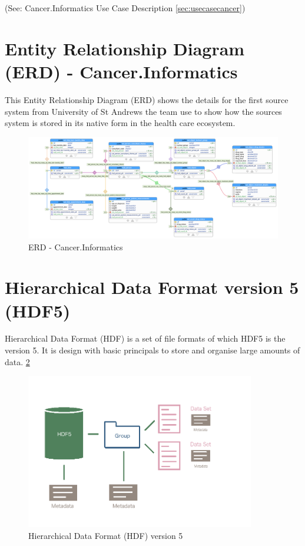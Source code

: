 (See: Cancer.Informatics Use Case Description \ref{sec:usecasecancer})

\section{Entity Relationship Diagram (ERD) - Cancer.Informatics}

This Entity Relationship Diagram (ERD) shows the details for the first source system from University of St Andrews the team use to show how the sources system is stored in its native form in the health care ecosystem.

\begin{figure}[H]
    \centering
    \includegraphics[width=14cm]{figures/technical/dv_chemocare_treatment_db.png}
    \caption{ERD - Cancer.Informatics}
    \label{fig:figERD_CancerInformatics}
\end{figure}

\section{Hierarchical Data Format version 5 (HDF5)}

Hierarchical Data Format (HDF) is a set of file formats of which HDF5 is the version 5. It is design with basic principals to store and organise large amounts of data. \ref{fig:figHDF5} \cite{Folk2011}

\begin{figure}[H]
    \centering
    \includegraphics[width=10cm]{figures/technical/HDF5.png}
    \caption{Hierarchical Data Format (HDF) version 5}
    \label{fig:figHDF5}
\end{figure}

